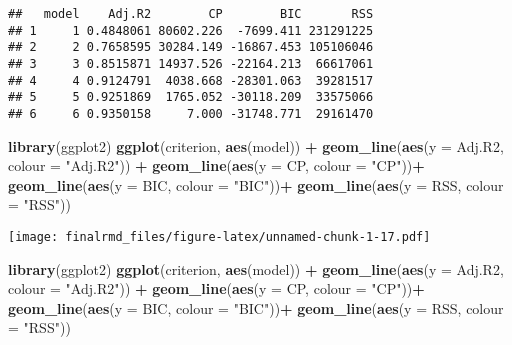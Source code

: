 \documentclass[
]{article}
\newenvironment{Shaded}{\begin{snugshade}}{\end{snugshade}}
\newcommand{\AttributeTok}[1]{\textcolor[rgb]{0.13,0.29,0.53}{#1}}
\newcommand{\FunctionTok}[1]{\textcolor[rgb]{0.13,0.29,0.53}{\textbf{#1}}}
\newcommand{\NormalTok}[1]{#1}
\newcommand{\SpecialCharTok}[1]{\textcolor[rgb]{0.81,0.36,0.00}{\textbf{#1}}}
\newcommand{\StringTok}[1]{\textcolor[rgb]{0.31,0.60,0.02}{#1}}
\begin{document}
\begin{verbatim}
##   model    Adj.R2        CP        BIC       RSS
## 1     1 0.4848061 80602.226  -7699.411 231291225
## 2     2 0.7658595 30284.149 -16867.453 105106046
## 3     3 0.8515871 14937.526 -22164.213  66617061
## 4     4 0.9124791  4038.668 -28301.063  39281517
## 5     5 0.9251869  1765.052 -30118.209  33575066
## 6     6 0.9350158     7.000 -31748.771  29161470
\end{verbatim}

\begin{Shaded}
\begin{Highlighting}[]
\FunctionTok{library}\NormalTok{(ggplot2)}
\FunctionTok{ggplot}\NormalTok{(criterion, }\FunctionTok{aes}\NormalTok{(model)) }\SpecialCharTok{+}
 \FunctionTok{geom\_line}\NormalTok{(}\FunctionTok{aes}\NormalTok{(}\AttributeTok{y =}\NormalTok{ Adj.R2, }\AttributeTok{colour =} \StringTok{"Adj.R2"}\NormalTok{)) }\SpecialCharTok{+}
 \FunctionTok{geom\_line}\NormalTok{(}\FunctionTok{aes}\NormalTok{(}\AttributeTok{y =}\NormalTok{ CP, }\AttributeTok{colour =} \StringTok{"CP"}\NormalTok{))}\SpecialCharTok{+}
 \FunctionTok{geom\_line}\NormalTok{(}\FunctionTok{aes}\NormalTok{(}\AttributeTok{y =}\NormalTok{ BIC, }\AttributeTok{colour =} \StringTok{"BIC"}\NormalTok{))}\SpecialCharTok{+}
 \FunctionTok{geom\_line}\NormalTok{(}\FunctionTok{aes}\NormalTok{(}\AttributeTok{y =}\NormalTok{ RSS, }\AttributeTok{colour =} \StringTok{"RSS"}\NormalTok{))}
\end{Highlighting}
\end{Shaded}

\texttt{[image: finalrmd\_files/figure-latex/unnamed-chunk-1-17.pdf]}

\begin{Shaded}
\begin{Highlighting}[]
\FunctionTok{library}\NormalTok{(ggplot2)}
\FunctionTok{ggplot}\NormalTok{(criterion, }\FunctionTok{aes}\NormalTok{(model)) }\SpecialCharTok{+}
 \FunctionTok{geom\_line}\NormalTok{(}\FunctionTok{aes}\NormalTok{(}\AttributeTok{y =}\NormalTok{ Adj.R2, }\AttributeTok{colour =} \StringTok{"Adj.R2"}\NormalTok{)) }\SpecialCharTok{+}
 \FunctionTok{geom\_line}\NormalTok{(}\FunctionTok{aes}\NormalTok{(}\AttributeTok{y =}\NormalTok{ CP, }\AttributeTok{colour =} \StringTok{"CP"}\NormalTok{))}\SpecialCharTok{+}
 \FunctionTok{geom\_line}\NormalTok{(}\FunctionTok{aes}\NormalTok{(}\AttributeTok{y =}\NormalTok{ BIC, }\AttributeTok{colour =} \StringTok{"BIC"}\NormalTok{))}\SpecialCharTok{+}
 \FunctionTok{geom\_line}\NormalTok{(}\FunctionTok{aes}\NormalTok{(}\AttributeTok{y =}\NormalTok{ RSS, }\AttributeTok{colour =} \StringTok{"RSS"}\NormalTok{))}
\end{Highlighting}
\end{Shaded}
\end{document}
